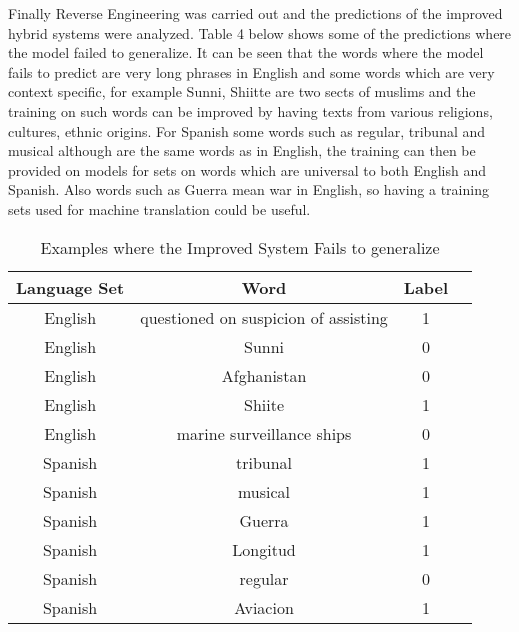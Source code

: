 \documentclass[10pt,a4paper]{article}
\begin{document}
Finally Reverse Engineering was carried out and the predictions of the improved hybrid systems were analyzed. Table 4 below shows some of the predictions where the model failed to generalize. It can be seen that the words where the model fails to predict are very long phrases in English and some words which are very context specific, for example Sunni, Shiitte are two sects of muslims and the training on such words can be improved by having texts from various religions, cultures, ethnic origins. For Spanish some words such as regular, tribunal and musical although are the same words as in English, the training can then be provided on models for sets on words which are universal to both English and Spanish. Also words such as Guerra mean war in English, so having a training sets used for machine translation could be useful.
\begin{table}[!htbp]
\begin{adjustbox}{right=8cm}
\begin{tabular}{|c|c|c|c|} \hline
\textbf{Language Set } &   \textbf{Word} &  \textbf{Label}  \\ \hline
 English  & questioned on suspicion of assisting & 1 \\ \hline
English & Sunni  &  0 \\ \hline
English  & Afghanistan & 0  \\ \hline
English  & Shiite & 1 \\ \hline
English  &  marine surveillance ships & 0 \\ \hline
Spanish  & tribunal & 1\\ \hline
Spanish & musical & 1\\ \hline
Spanish  &  Guerra & 1 \\ \hline
Spanish  &    Longitud & 1  \\ \hline
Spanish &  regular & 0\\ \hline
Spanish &Aviacion & 1 \\ \hline
\end{tabular}
\end{adjustbox}
\caption{Examples where the Improved System Fails to generalize}
\label{T:Features left after features with a specific percentage of Missing Values Removed}
\end{table}
\end{document}
